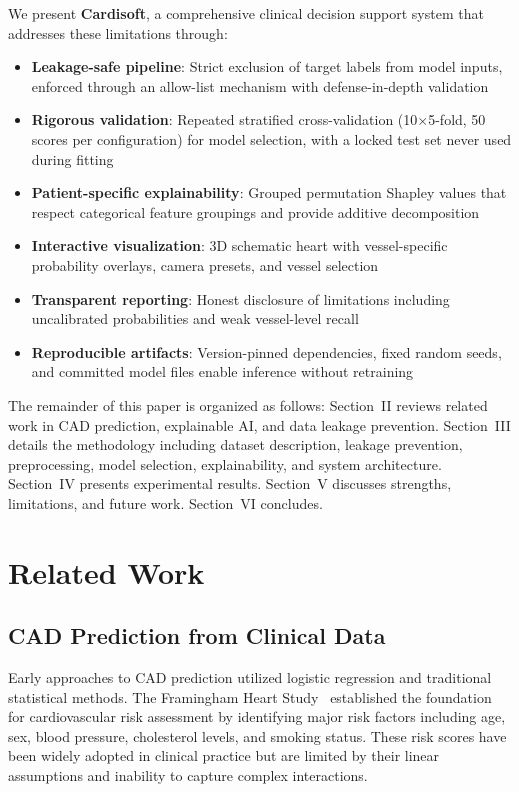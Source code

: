 \documentclass[conference]{IEEEtran}
\begin{document}
We present \textbf{Cardisoft}, a comprehensive clinical decision support system that addresses these limitations through:

\begin{itemize}
    \item \textbf{Leakage-safe pipeline}: Strict exclusion of target labels from model inputs, enforced through an allow-list mechanism with defense-in-depth validation
    \item \textbf{Rigorous validation}: Repeated stratified cross-validation (10$\times$5-fold, 50 scores per configuration) for model selection, with a locked test set never used during fitting
    \item \textbf{Patient-specific explainability}: Grouped permutation Shapley values that respect categorical feature groupings and provide additive decomposition
    \item \textbf{Interactive visualization}: 3D schematic heart with vessel-specific probability overlays, camera presets, and vessel selection
    \item \textbf{Transparent reporting}: Honest disclosure of limitations including uncalibrated probabilities and weak vessel-level recall
    \item \textbf{Reproducible artifacts}: Version-pinned dependencies, fixed random seeds, and committed model files enable inference without retraining
\end{itemize}

The remainder of this paper is organized as follows: Section~II reviews related work in CAD prediction, explainable AI, and data leakage prevention. Section~III details the methodology including dataset description, leakage prevention, preprocessing, model selection, explainability, and system architecture. Section~IV presents experimental results. Section~V discusses strengths, limitations, and future work. Section~VI concludes.

\section{Related Work}

\subsection{CAD Prediction from Clinical Data}

Early approaches to CAD prediction utilized logistic regression and traditional statistical methods. The Framingham Heart Study~\cite{framingham} established the foundation for cardiovascular risk assessment by identifying major risk factors including age, sex, blood pressure, cholesterol levels, and smoking status. These risk scores have been widely adopted in clinical practice but are limited by their linear assumptions and inability to capture complex interactions.
\end{document}
